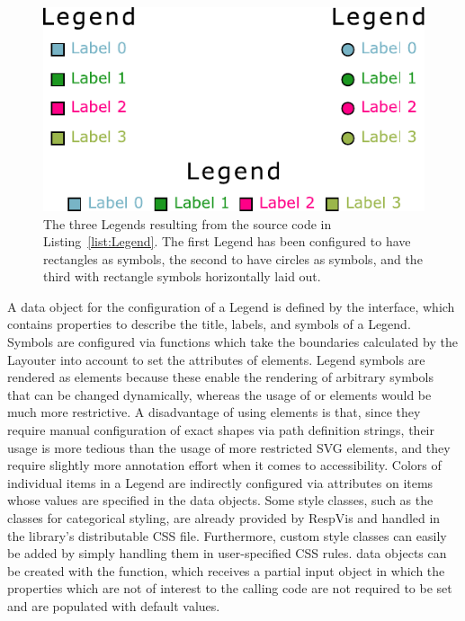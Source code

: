\begin{figure}[tp]
\centering
\includegraphics[keepaspectratio,width=\linewidth / 2,height=\fullh]
{diagrams/legend.pdf}
\caption[Legend Example]{%
The three Legends resulting from the source code in
Listing~\ref{list:Legend}. The first Legend has been configured to have
rectangles as symbols, the second to have circles as
symbols, and the third with rectangle symbols horizontally laid out.
}
\label{fig:Legend}
\end{figure}



A data object for the configuration of a Legend is defined by the
 interface, which contains properties to describe the
title, labels, and symbols of a Legend. Symbols are configured via
functions which take the boundaries calculated by the Layouter into
account to set the  attributes of  elements.
Legend symbols are rendered as  elements because these
enable the rendering of arbitrary symbols that can be changed
dynamically, whereas the usage of  or 
elements would be much more restrictive. A disadvantage of using
 elements is that, since they require manual
configuration of exact shapes via path definition strings, their usage
is more tedious than the usage of more restricted SVG elements, and
they require slightly more annotation effort when it comes to
accessibility. Colors of individual items in a Legend are indirectly
configured via  attributes on items whose values are
specified in the  data objects. Some style classes, such
as the  classes for categorical styling, are
already provided by RespVis and handled in the library's distributable
CSS file. Furthermore, custom style classes can easily be added by
simply handling them in user-specified CSS rules.  data
objects can be created with the  function, which
receives a partial input object in which the properties which are not
of interest to the calling code are not required to be set and are
populated with default values.

